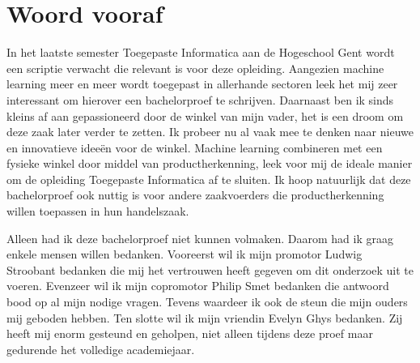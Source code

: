 
\chapter*{Woord vooraf}
\label{ch:voorwoord}


In het laatste semester Toegepaste Informatica aan de Hogeschool Gent wordt een scriptie verwacht die relevant is voor deze opleiding.  Aangezien machine learning meer en meer wordt toegepast in allerhande sectoren leek het mij zeer interessant om hierover een bachelorproef te schrijven.  Daarnaast ben ik sinds kleins af aan gepassioneerd door de winkel van mijn vader, het is een droom om deze zaak later verder te zetten. Ik probeer nu al vaak mee te denken naar nieuwe en innovatieve ideeën voor de winkel. Machine learning combineren met een fysieke winkel door middel van productherkenning, leek voor mij de ideale manier om de opleiding Toegepaste Informatica af te sluiten. Ik hoop natuurlijk dat deze bachelorproef ook nuttig is voor andere zaakvoerders die productherkenning willen toepassen in hun handelszaak.

Alleen had ik deze bachelorproef niet kunnen volmaken. Daarom had ik graag enkele mensen willen bedanken. Vooreerst wil ik mijn promotor Ludwig Stroobant bedanken die mij het vertrouwen heeft gegeven om dit onderzoek uit te voeren. Evenzeer wil ik mijn copromotor Philip Smet bedanken die antwoord bood op al mijn nodige vragen. Tevens waardeer ik ook de steun die mijn ouders mij geboden hebben. Ten slotte wil ik mijn vriendin Evelyn Ghys bedanken. Zij heeft mij enorm gesteund en geholpen, niet alleen tijdens deze proef maar gedurende het volledige academiejaar. 
